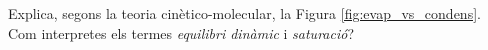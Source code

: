\begin{exr}{}
Explica, segons la teoria cinètico-molecular, la Figura \ref{fig:evap_vs_condens}. Com interpretes els termes \emph{equilibri dinàmic} i \emph{saturació}?
\end{exr}

